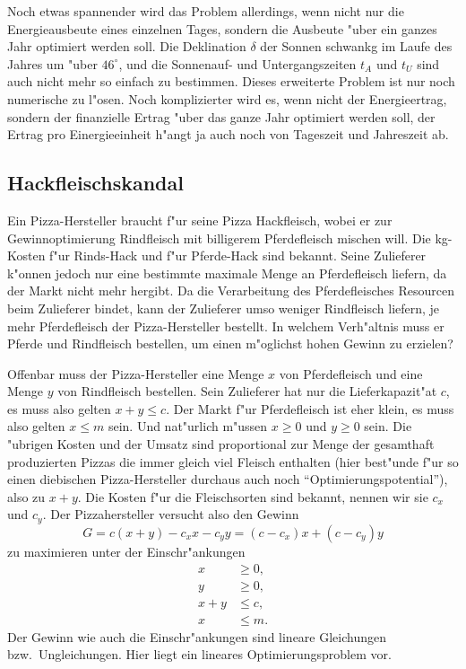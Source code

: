 Noch etwas spannender wird das Problem allerdings, wenn nicht nur
die Energieausbeute eines einzelnen Tages, sondern die Ausbeute
"uber ein ganzes Jahr optimiert werden soll.
Die Deklination $\delta$
der Sonnen schwankg im Laufe des Jahres um "uber $46^\circ$, und die
Sonnenauf- und Untergangszeiten $t_A$ und $t_U$ sind auch nicht mehr 
so einfach zu bestimmen. Dieses erweiterte Problem ist nur noch
numerische zu l"osen. Noch komplizierter wird es, wenn nicht der Energieertrag,
sondern der finanzielle Ertrag "uber das ganze Jahr optimiert werden soll,
der Ertrag pro Einergieeinheit h"angt ja
auch noch von Tageszeit und Jahreszeit ab.

\subsection{Hackfleischskandal\label{uebersicht:hackfleisch}}
Ein Pizza-Hersteller braucht f"ur seine Pizza Hackfleisch, wobei er
zur Gewinnoptimierung Rindfleisch mit billigerem Pferdefleisch mischen
will. Die kg-Kosten f"ur Rinds-Hack und f"ur Pferde-Hack sind bekannt.
Seine Zulieferer k"onnen jedoch nur eine bestimmte maximale Menge
an Pferdefleisch liefern, da der Markt nicht mehr hergibt.
Da die Verarbeitung des Pferdefleisches Resourcen beim Zulieferer
bindet, kann der Zulieferer umso weniger Rindfleisch liefern, je mehr
Pferdefleisch der Pizza-Hersteller bestellt. In welchem Verh"altnis
muss er Pferde und Rindfleisch bestellen, um einen m"oglichst hohen
Gewinn zu erzielen?

Offenbar muss der Pizza-Hersteller eine Menge $x$ von Pferdefleisch
und eine Menge $y$ von Rindfleisch bestellen. Sein Zulieferer hat
nur die Lieferkapazit"at $c$, es muss also gelten $x+y\le c$.
Der Markt f"ur Pferdefleisch ist eher klein, es muss also gelten
$x\le m$ sein. Und nat"urlich m"ussen $x\ge 0$ und $y\ge 0$ sein.
Die "ubrigen Kosten und der Umsatz sind proportional zur Menge
der gesamthaft produzierten Pizzas die immer gleich viel Fleisch
enthalten (hier best"unde f"ur so einen diebischen Pizza-Hersteller
durchaus auch noch ``Optimierungspotential''), also zu $x+y$. Die
Kosten f"ur die Fleischsorten sind bekannt, nennen wir sie $c_x$ und $c_y$.
Der Pizzahersteller versucht also den Gewinn
\[
G=
c(x+y)-c_xx-c_yy
=(c-c_x)x+(c-c_y)y
\]
zu maximieren unter der Einschr"ankungen
\begin{align*}
x&\ge 0,\\y&\ge 0,\\
x+y&\le c,\\
x&\le m.
\end{align*}
Der Gewinn wie auch die Einschr"ankungen sind lineare Gleichungen
bzw.~Ungleichungen. Hier liegt ein lineares Optimierungsproblem vor.

